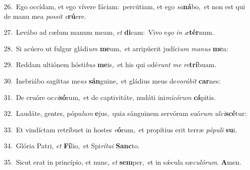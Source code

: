 {\numbfont\textcolor{\numbcolor}{26.}}~Ego occídam, et ego vívere fáciam:~\dagger percútiam, et ego \textit{sa}\-\textbf{ná}bo,~\star et non est qui de manu mea \textit{pos}\-\textit{sit} \textit{e}\-\textbf{rú}ere.\par
{\numbfont\textcolor{\numbcolor}{27.}}~Levábo ad cælum manum meam, \textit{et} \textbf{di}\-cam:~\star Vivo e\textit{go} \textit{in} \textit{æ}\-\textbf{tér}num.\par
{\numbfont\textcolor{\numbcolor}{28.}}~Si acúero ut fulgur gládi\textit{um} \textbf{me}\-um,~\star et arripúerit judíci\textit{um} \textit{ma}\-\textit{nus} \textbf{me}\-a:\par
{\numbfont\textcolor{\numbcolor}{29.}}~Reddam ultiónem hósti\textit{bus} \textbf{me}\-is,~\star et his qui odé\textit{runt} \textit{me} \textit{re}\-\textbf{trí}buam.\par
{\numbfont\textcolor{\numbcolor}{30.}}~Inebriábo sagíttas me\textit{as} \textbf{sán}\-guine,~\star et gládius meus de\-\textit{vo}\-\textit{rá}\textit{bit} \textbf{car}\-nes:\par
{\numbfont\textcolor{\numbcolor}{31.}}~De cruóre oc\-\textit{ci}\-\textbf{só}rum,~\star et de captivitáte, nudáti ini\-\textit{mi}\-\textit{có}\textit{rum} \textbf{cá}\-pitis.\par
{\numbfont\textcolor{\numbcolor}{32.}}~Laudáte, gentes, pópu\textit{lum} \textbf{e}\-jus,~\star quia sánguinem servórum suó\textit{rum} \textit{ul}\-\textit{ci}\textbf{scé}tur:\par
{\numbfont\textcolor{\numbcolor}{33.}}~Et vindíctam retríbuet in hostes \textit{e}\-\textbf{ó}rum,~\star et propítius erit terræ \textit{pó}\-\textit{pu}\textit{li} \textbf{su}\-i.\par
{\numbfont\textcolor{\numbcolor}{34.}}~Glória Patri, \textit{et} \textbf{Fí}\-lio,~\star et Spi\-\textit{rí}\-\textit{tu}\textit{i} \textbf{Sanc}\-to.\par
{\numbfont\textcolor{\numbcolor}{35.}}~Sicut erat in princípio, et nunc, \textit{et} \textbf{sem}\-per,~\star et in sǽcula sæ\-\textit{cu}\-\textit{ló}\textit{rum}. \textbf{A}\-men.\par
